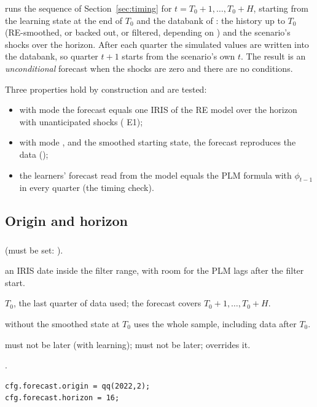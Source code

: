 \documentclass[11pt,a4paper]{article}
\DeclareRobustCommand{\codem}[1]{\texttt{\detokenize{#1}}}
\newenvironment{optspec}%
  {\begin{description}[style=sameline,leftmargin=2.7cm,labelwidth=2.5cm,font=\normalfont\itshape]}%
  {\end{description}}
\begin{document}
 runs the sequence of Section~\ref{sec:timing} for
$t = T_0+1,\dots,T_0+H$, starting from the learning state at the end of $T_0$ and the databank of
: the history up to $T_0$ (RE-smoothed, or backed out, or filtered,
depending on ) and the scenario's shocks over the horizon. After each quarter the
simulated values are written into the databank, so quarter $t+1$ starts from the scenario's own
$t$. The result is an \emph{unconditional} forecast when the shocks are zero and there are no
conditions.

Three properties hold by construction and are tested:
\begin{itemize}[nosep]
  \item with mode  the forecast equals one IRIS  of the RE model
        over the horizon with unanticipated shocks ( E1);
  \item with mode ,  and the smoothed starting
        state, the forecast reproduces the data ();
  \item the learners' forecast read from the model equals the PLM formula with $\phi_{t-1}$ in
        every quarter (the timing check).
\end{itemize}

\subsection{Origin and horizon}

\subsubsection{\texorpdfstring{\codem{forecast.origin}}{forecast.origin}}\label{opt:forecast-origin}
\begin{optspec}
  \item[Default] \code{[]} (must be set: ).
  \item[Values] an IRIS date inside the filter range, with room for the PLM lags after the filter
        start.
  \item[Math] $T_0$, the last quarter of data used; the forecast covers $T_0+1,\dots,T_0+H$.
  \item[Assumptions] without  the smoothed state at $T_0$ uses the whole
        sample, including data after $T_0$.
  \item[Interactions]  must not be later (with learning);
         must not be later;  overrides it.
  \item[Code] .
  \item[Example]
\begin{lstlisting}
cfg.forecast.origin = qq(2022,2);
cfg.forecast.horizon = 16;
\end{lstlisting}
\end{optspec}
\end{document}
